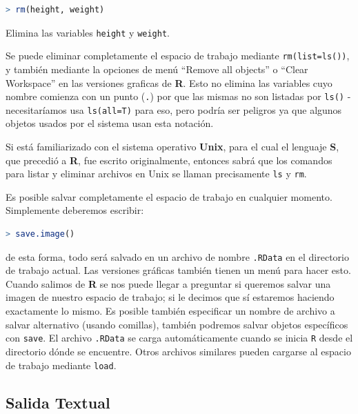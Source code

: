 \begin{lstlisting}[language=R]
> rm(height, weight)
\end{lstlisting}

Elimina las variables \texttt{height} y \texttt{weight}.

Se puede eliminar completamente el espacio de trabajo mediante
\texttt{rm(list=ls())}, y también mediante la opciones de menú “Remove all
objects” o “Clear Workspace” en las versiones graficas de \textbf{R}. Esto no
elimina las variables cuyo nombre comienza con un punto (\texttt{.}) por que
las mismas no son listadas por \texttt{ls()} - necesitaríamos usa
\texttt{ls(all=T)} para eso,  pero podría ser peligros ya que algunos objetos
usados por el sistema usan esta notación.

Si está familiarizado con el sistema operativo \textbf{Unix}, para el cual el
lenguaje \textbf{S}, que precedió a \textbf{R}, fue escrito originalmente,
entonces sabrá que los comandos para listar y eliminar archivos en Unix se
llaman precisamente \texttt{ls} y \texttt{rm}.

Es posible salvar completamente el espacio de trabajo en cualquier momento.
Simplemente deberemos escribir:

\begin{lstlisting}[language=R]
> save.image()
\end{lstlisting}

de esta forma, todo será salvado en un archivo de nombre \texttt{.RData} en el
directorio de trabajo actual. Las versiones gráficas también tienen un menú
para hacer esto. Cuando salimos de \textbf{R} se nos puede llegar a preguntar
si queremos salvar una imagen de nuestro espacio de trabajo; si le decimos que
sí estaremos haciendo exactamente lo mismo. Es posible también especificar un
nombre de archivo a salvar alternativo (usando comillas), también podremos
salvar objetos específicos con \texttt{save}. El archivo \texttt{.RData} se
carga automáticamente cuando se inicia \texttt{R} desde el directorio dónde se
encuentre. Otros archivos similares pueden cargarse al espacio de trabajo
mediante \texttt{load}.

\subsection{Salida Textual}

